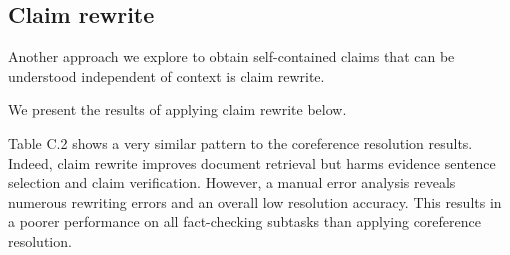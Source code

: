 \subsection{Claim rewrite}
Another approach we explore to obtain self-contained claims that can be understood independent of context is claim rewrite. 

We present the results of applying claim rewrite below.
\begin{table}[H]
\hspace{-0.4cm}
\smallskip
\caption{Impact of claim rewrite on each stage of the fact-checking process on DialFact \textsc{Dev}.}
\end{table}
Table C.2 shows a very similar pattern to the coreference resolution results. Indeed, claim rewrite improves document retrieval but harms evidence sentence selection and claim verification. However, a manual error analysis reveals numerous rewriting errors and an overall low resolution accuracy. This results in a poorer performance on all fact-checking subtasks than applying coreference resolution.
